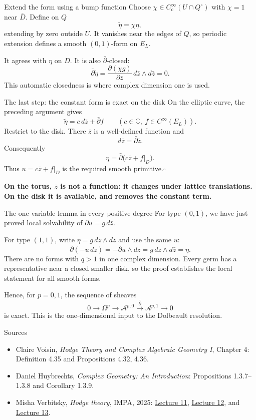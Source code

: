 \documentclass[aspectratio=169,11pt]{beamer}
\newcommand{\db}{\bar\partial}
\newcommand{\C}{\mathbb C}
\newcommand{\A}{\mathcal A}
\begin{document}
\begin{frame}{Extend the form using a bump function}
Choose $\chi\in C_c^\infty(U\cap Q^\circ)$ with
$\chi=1$ near $\overline D$.
Define on $Q$
\[
 \widetilde\eta=\chi\eta,
\]
extending by zero outside $U$. It vanishes near the edges of $Q$, so
periodic extension defines a smooth $(0,1)$-form on $E_L$.

It agrees with $\eta$ on $D$. It is also $\db$-closed:
\[
 \db\widetilde\eta
 =\frac{\partial(\chi g)}{\partial\bar z}\,
 d\bar z\wedge d\bar z=0.
\]
This automatic closedness is where complex dimension one is used.
\end{frame}

\begin{frame}{The last step: the constant form is exact on the disk}
On the elliptic curve, the preceding argument gives
\[
 \widetilde\eta=c\,d\bar z+\db f
 \qquad(c\in\C,\ f\in C^\infty(E_L)).
\]
Restrict to the disk. There $\bar z$ is a well-defined function and
\[
 d\bar z=\db\bar z.
\]
Consequently
\[
 \eta=\db\bigl(c\bar z+f|_D\bigr).
\]
Thus $u=c\bar z+f|_D$ is the required smooth primitive.\hfill$\square$

\textbf{On the torus, $\bar z$ is not a function: it changes under lattice
translations. On the disk it is available, and removes the constant term.}
\end{frame}

\begin{frame}{The one-variable lemma in every positive degree}
For type $(0,1)$, we have just proved local solvability of
$\db u=g\,d\bar z$.

For type $(1,1)$, write $\eta=g\,dz\wedge d\bar z$ and use the same $u$:
\[
 \db(-u\,dz)
 =-\db u\wedge dz
 =g\,dz\wedge d\bar z=\eta.
\]
There are no forms with $q>1$ in one complex dimension.
Every germ has a representative near a closed smaller disk, so the proof
establishes the local statement for all smooth forms.

Hence, for $p=0,1$, the sequence of sheaves
\[
 0\longrightarrow\Omega^p\longrightarrow\A^{p,0}
 \xrightarrow{\db}\A^{p,1}\longrightarrow0
\]
is exact. This is the one-dimensional input to the Dolbeault resolution.
\end{frame}

\begin{frame}{Sources}
\begin{itemize}
\item Claire Voisin, \emph{Hodge Theory and Complex Algebraic Geometry I},
Chapter 4: Definition 4.35 and Propositions 4.32, 4.36.
\item Daniel Huybrechts, \emph{Complex Geometry: An Introduction}:
Propositions 1.3.7--1.3.8 and Corollary 1.3.9.
\item Misha Verbitsky, \emph{Hodge theory}, IMPA, 2025:
\href{http://verbit.ru/IMPA/Kahler-2025/slides-Kahler-2025-11.pdf}{Lecture 11},
\href{http://verbit.ru/IMPA/Kahler-2025/slides-Kahler-2025-12.pdf}{Lecture 12},
and \href{http://verbit.ru/IMPA/Kahler-2025/slides-Kahler-2025-13.pdf}{Lecture 13}.
\end{itemize}
\end{frame}
\end{document}
